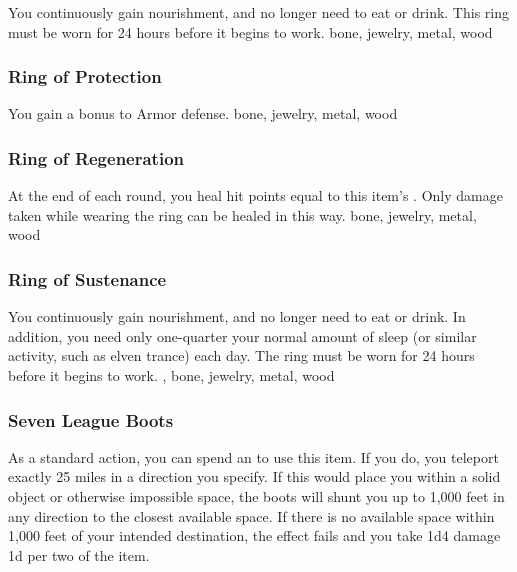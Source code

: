 You continuously gain nourishment, and no longer need to eat or drink.
This ring must be worn for 24 hours before it begins to work.
 
 bone, jewelry, metal, wood
\lowercase{\hypertarget{item:Ring of Protection}{}}\label{item:Ring of Protection}
\hypertarget{item:Ring of Protection}{\subsubsection{Ring of Protection\hfill{}}}
You gain a  bonus to Armor defense.
 
 bone, jewelry, metal, wood
\lowercase{\hypertarget{item:Ring of Regeneration}{}}\label{item:Ring of Regeneration}
\hypertarget{item:Ring of Regeneration}{\subsubsection{Ring of Regeneration\hfill{}}}
At the end of each round, you heal hit points equal to this item's .
Only damage taken while wearing the ring can be healed in this way.
 
 bone, jewelry, metal, wood
\lowercase{\hypertarget{item:Ring of Sustenance}{}}\label{item:Ring of Sustenance}
\hypertarget{item:Ring of Sustenance}{\subsubsection{Ring of Sustenance\hfill{}}}
You continuously gain nourishment, and no longer need to eat or drink.
In addition, you need only one-quarter your normal amount of sleep (or similar activity, such as elven trance) each day.
The ring must be worn for 24 hours before it begins to work.
 , 
 bone, jewelry, metal, wood
\lowercase{\hypertarget{item:Seven League Boots}{}}\label{item:Seven League Boots}
\hypertarget{item:Seven League Boots}{\subsubsection{Seven League Boots\hfill{}}}
As a standard action, you can spend an  to use this item.
If you do, you teleport exactly 25 miles in a direction you specify.
If this would place you within a solid object or otherwise impossible space, the boots will shunt you up to 1,000 feet in any direction to the closest available space.
If there is no available space within 1,000 feet of your intended destination, the effect fails and you take 1d4 damage \plus1d per two  of the item.
